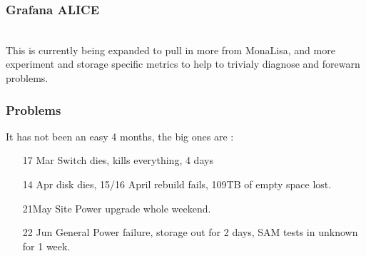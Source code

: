 \documentclass{beamer}
\begin{document}
\begin{frame}
  \frametitle{Grafana ALICE}
  \\
  This is currently being expanded to pull in more from MonaLisa, and more experiment and storage specific
  metrics to help to trivialy diagnose and forewarn problems.
\end{frame}

\begin{frame}
\frametitle{Problems}
It has not been an easy 4 months, the big ones are :
\begin{itemize}
  \item [17 Mar] Switch dies, kills everything, 4 days
  \item [14 Apr] disk dies, 15/16 April rebuild fails, 109TB of empty space lost.
  \item [21May] Site Power upgrade whole weekend.
  \item [22 Jun] General Power failure, storage out for 2 days, SAM tests in unknown for 1 week.
\end{itemize}
\end{frame}
\end{document}

